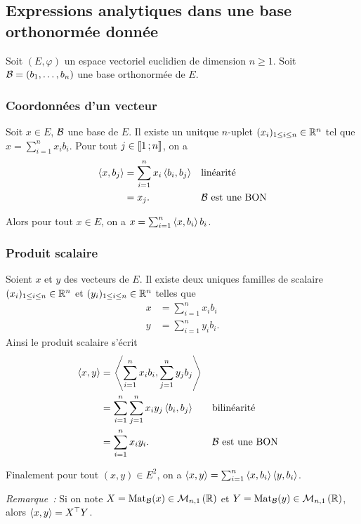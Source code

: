 \subsection{Expressions analytiques dans une base orthonormée donnée}

Soit $(E,\varphi)$ un espace vectoriel euclidien de dimension $n \geq 1$. Soit $\mathcal{B}=(b_1, \ldots, b_n)$ une base orthonormée de $E$.

\subsubsection{Coordonnées d'un vecteur}

Soit $x \in E$, $\mathcal{B}$ une base de $E$. Il existe un unitque $n$-uplet $(x_i)_{1 \leq i \leq n}\in\mathbb{R}^n$ tel que $x = \sum_{i=1}^n x_ib_i$. Pour tout $j \in \mathopen{\llbracket}1\mathclose{}\mathpunct{};n\mathclose{\rrbracket}$, on a
\begin{align}
  \left\langle{x},{b_j}\right\rangle &=\sum_{i=1}^n x_i\left\langle{b_i},{b_j}\right\rangle && \text{linéarité} \\
  &=x_j. && \mathcal{B} \text{~est une BON}
\end{align}

Alors pour tout $x \in E$, on a $x = \sum_{i=1}^n \left\langle{x},{b_i}\right\rangle b_i$.

\subsubsection{Produit scalaire}

Soient $x$ et $y$ des vecteurs de $E$. Il existe deux uniques familles de scalaire $(x_i)_{1 \leq i \leq n}\in\mathbb{R}^n$ et $(y_i)_{1 \leq i \leq n}\in\mathbb{R}^n$ telles que
\begin{align}
  x &= \sum_{i=1}^n x_ib_i \\
  y &= \sum_{i=1}^n y_ib_i.
\end{align}
Ainsi le produit scalaire s'écrit
\begin{align}
  \left\langle{x},{y}\right\rangle &=\left\langle{\sum_{i=1}^n x_ib_i},{\sum_{j=1}^n y_jb_j}\right\rangle \\
  &=\sum_{i=1}^n  \sum_{j=1}^n x_i y_j \left\langle{b_i},{b_j}\right\rangle && \text{bilinéarité} \\
  &=\sum_{i=1}^n  x_i y_i. && \mathcal{B} \text{~est une BON}
\end{align}

Finalement pour tout $(x,y) \in E^2$, on a $\left\langle{x},{y}\right\rangle = \sum_{i=1}^n \left\langle{x},{b_i}\right\rangle\left\langle{y},{b_i}\right\rangle$.

\emph{Remarque~:} Si on note $X=\mathrm{Mat}_{\mathcal{B}}(x) \in \mathcal{M}_{n,1}\left(\mathbb{R}\right)$ et $Y=\mathrm{Mat}_{\mathcal{B}}(y) \in \mathcal{M}_{n,1}\left(\mathbb{R}\right)$, alors $\left\langle{x},{y}\right\rangle = X^{\top}Y$.

